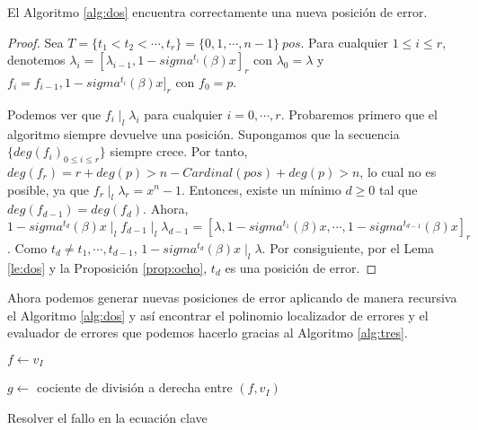 \begin{proposition}
    El Algoritmo \ref{alg:dos} encuentra correctamente una nueva posición de error.
\end{proposition}

\begin{proof}
    Sea $T = \{t_1 < t_2 < \cdots,t_r \} = \{ 0,1,\cdots,n-1 \} \ pos$. Para cualquier $1 \leq i \leq r$, denotemos $\lambda_i = [\lambda_{i-1},1-sigma^{t_i}(\beta)x ]_r$ con $\lambda_0 = \lambda$ y $f_i = f_{i-1},1-sigma^{t_i}(\beta)x ]_r$ con $f_0 = p$.

Podemos ver que $f_i \mid_l \lambda_i$ para cualquier $i=0,\cdots,r$. Probaremos primero que el algoritmo siempre devuelve una posición. Supongamos que la secuencia $\{deg(f_i)_{0\leq i \leq r } \}$ siempre crece. Por tanto, $deg(f_r) = r+deg(p) > n-Cardinal(pos)+deg(p) > n$, lo cual no es posible, ya que $f_r \mid_l \lambda_r = x^n-1$. Entonces, existe un mínimo $d \geq 0$ tal que $deg(f_{d-1}) = deg(f_d)$. Ahora, $1-sigma^{t_d}(\beta)x \mid_l f_{d-1} \mid_l \lambda_{d-1} = [ \lambda,1-sigma^{t_1}(\beta)x,\cdots,1-sigma^{t_{d-1}}(\beta)x]_r$. Como  $t_d \neq t_1,\cdots,t_{d-1}$, $1-sigma^{t_d}(\beta)x \mid_l \lambda$. Por consiguiente, por el Lema \ref{le:dos} y la Proposición \ref{prop:ocho}, $t_d$ es una posición de error.
\end{proof}

Ahora podemos generar nuevas posiciones de error aplicando de manera recursiva el Algoritmo \ref{alg:dos} y así encontrar el polinomio localizador de errores y el evaluador de errores que podemos hacerlo gracias al Algoritmo \ref{alg:tres}.

\begin{algorithm}
    \SetAlgoNoLine


    \BlankLine

    $f \gets v_I$
    
     $g \gets $ cociente de división a derecha entre $ (f,v_I) $  
    
    \caption{Resolver el fallo en la ecuación clave}
    \label{alg:tres}
\end{algorithm}

